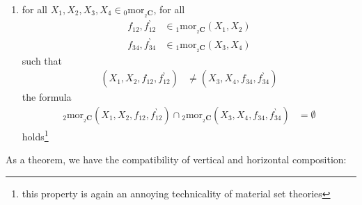 \begin{enumerate}
\begin{align*}
  f_{12},f_{12}^{\backprime}
  &\in
  {}_{1}\mathrm{mor}_{{}_{2}\mathbf{C}}(X_{1},X_{2})
  \\
  f_{21},f_{21}^{\backprime}
  &\in
  {}_{1}\mathrm{mor}_{{}_{2}\mathbf{C}}(X_{2},X_{1})
\end{align*}
and for all
\begin{align*}
  {}_{2}f_{\alpha}
  &\in
  {}_{2}\mathrm{mor}_{{}_{2}\mathbf{C}}(X_{1},X_{2},f_{12},f_{12}^{\backprime})
  \\
  {}_{2}f_{\beta}
  &\in
  {}_{2}\mathrm{mor}_{{}_{2}\mathbf{C}}(X_{2},X_{1},f_{21},f_{21}^{\backprime})
\end{align*}
with $X_{2} \in {}_{0}\mathrm{mor}_{{}_{2}\mathbf{C}}$ both
\begin{align*}
  \circ_{{}_{2}\mathbf{C}}^{\textrm{h}}
  (X_{1},X_{1},X_{2})
  (\mathrm{id}_{\mathrm{id}_{X_{1}}},{}_{2}f_{\alpha})
  &=
  {}_{2}f_{\alpha}
\end{align*}
and
\begin{align*}
  \circ_{{}_{2}\mathbf{C}}^{\textrm{h}}
  (X_{2},X_{1},X_{1})
  ({}_{2}f_{\beta},\mathrm{id}_{\mathrm{id}_{X_{1}}})
  &=
  {}_{2}f_{\beta}
\end{align*}
\item[(${}_{2}$C3)]
for all $X_{1},X_{2},X_{3},X_{4} \in {}_{0}\mathrm{mor}_{{}_{2}\mathbf{C}}$, for all
\begin{align*}
  f_{12},f_{12}^{\backprime}
  &\in
  {}_{1}\mathrm{mor}_{{}_{2}\mathbf{C}}(X_{1},X_{2})
  \\
  f_{34},f_{34}^{\backprime}
  &\in
  {}_{1}\mathrm{mor}_{{}_{2}\mathbf{C}}(X_{3},X_{4})
\end{align*}
such that
\begin{align*}
  (X_{1},X_{2},f_{12},f_{12}^{\backprime})
  &\neq
  (X_{3},X_{4},f_{34},f_{34}^{\backprime})
\end{align*}
the formula
\begin{align*}
  {}_{2}\mathrm{mor}_{{}_{2}\mathbf{C}}(X_{1},X_{2},f_{12},f_{12}^{\backprime})
  \cap
  {}_{2}\mathrm{mor}_{{}_{2}\mathbf{C}}(X_{3},X_{4},f_{34},f_{34}^{\backprime})
  &=
  \emptyset
\end{align*}
holds\footnote{this property is again an annoying technicality of material set theories}
\end{enumerate}
As a theorem, we have the compatibility of vertical and horizontal composition:
\\
